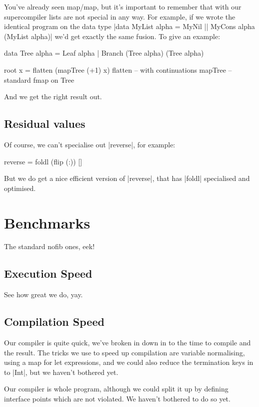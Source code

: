 \documentclass[draft]{sigplanconf}
\begin{document}
You've already seen map/map, but it's important to remember that with our supercompiler lists are not special in any way. For example, if we wrote the identical program on the data type |data MyList alpha = MyNil || MyCons alpha (MyList alpha)| we'd get exactly the same fusion. To give an example:

\begin{code}
data Tree alpha = Leaf alpha | Branch (Tree alpha) (Tree alpha)

root x = flatten (mapTree (+1) x)
flatten -- with continuations
mapTree -- standard fmap on Tree
\end{code}

And we get the right result out.

\subsection{Residual values}

Of course, we can't specialise out |reverse|, for example:

\begin{code}
reverse = foldl (flip (:)) []
\end{code}

But we do get a nice efficient version of |reverse|, that has |foldl| specialised and optimised.

\section{Benchmarks}
\label{sec:benchmarks}

The standard nofib ones, eek!

\subsection{Execution Speed}

See how great we do, yay.

\subsection{Compilation Speed}

Our compiler is quite quick, we've broken in down in to the time to compile and the result. The tricks we use to speed up compilation are variable normalising, using a map for let expressions, and we could also reduce the termination keys in to |Int|, but we haven't bothered yet.

Our compiler is whole program, although we could split it up by defining interface points which are not violated. We haven't bothered to do so yet.
\end{document}

